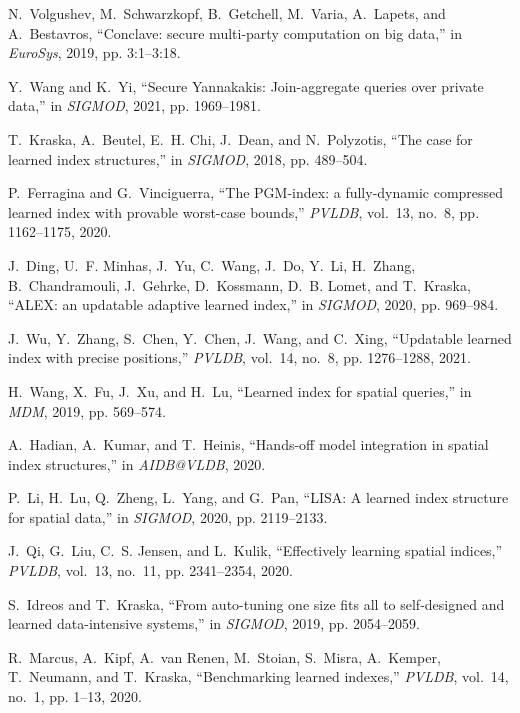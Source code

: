 \documentclass[11pt]{article}
\begin{document}
\begin{thebibliography}{10}
N.~Volgushev, M.~Schwarzkopf, B.~Getchell, M.~Varia, A.~Lapets, and
  A.~Bestavros, ``Conclave: secure multi-party computation on big data,'' in
  \emph{{EuroSys}}, 2019, pp. 3:1--3:18.

Y.~Wang and K.~Yi, ``Secure {Y}annakakis: Join-aggregate queries over private
  data,'' in \emph{{SIGMOD}}, 2021, pp. 1969--1981.

T.~Kraska, A.~Beutel, E.~H. Chi, J.~Dean, and N.~Polyzotis, ``The case for
  learned index structures,'' in \emph{{SIGMOD}}, 2018, pp. 489--504.

P.~Ferragina and G.~Vinciguerra, ``The {PGM}-index: a fully-dynamic compressed
  learned index with provable worst-case bounds,'' \emph{{PVLDB}}, vol.~13,
  no.~8, pp. 1162--1175, 2020.

J.~Ding, U.~F. Minhas, J.~Yu, C.~Wang, J.~Do, Y.~Li, H.~Zhang, B.~Chandramouli,
  J.~Gehrke, D.~Kossmann, D.~B. Lomet, and T.~Kraska, ``{ALEX:} an updatable
  adaptive learned index,'' in \emph{{SIGMOD}}, 2020, pp. 969--984.

J.~Wu, Y.~Zhang, S.~Chen, Y.~Chen, J.~Wang, and C.~Xing, ``Updatable learned
  index with precise positions,'' \emph{{PVLDB}}, vol.~14, no.~8, pp.
  1276--1288, 2021.

H.~Wang, X.~Fu, J.~Xu, and H.~Lu, ``Learned index for spatial queries,'' in
  \emph{{MDM}}, 2019, pp. 569--574.

A.~Hadian, A.~Kumar, and T.~Heinis, ``Hands-off model integration in spatial
  index structures,'' in \emph{AIDB@VLDB}, 2020.

P.~Li, H.~Lu, Q.~Zheng, L.~Yang, and G.~Pan, ``{LISA:} {A} learned index
  structure for spatial data,'' in \emph{{SIGMOD}}, 2020, pp. 2119--2133.

J.~Qi, G.~Liu, C.~S. Jensen, and L.~Kulik, ``Effectively learning spatial
  indices,'' \emph{{PVLDB}}, vol.~13, no.~11, pp. 2341--2354, 2020.

S.~Idreos and T.~Kraska, ``From auto-tuning one size fits all to self-designed
  and learned data-intensive systems,'' in \emph{{SIGMOD}}, 2019, pp.
  2054--2059.

R.~Marcus, A.~Kipf, A.~van Renen, M.~Stoian, S.~Misra, A.~Kemper, T.~Neumann,
  and T.~Kraska, ``Benchmarking learned indexes,'' \emph{{PVLDB}}, vol.~14,
  no.~1, pp. 1--13, 2020.


\end{thebibliography}
\end{document}
